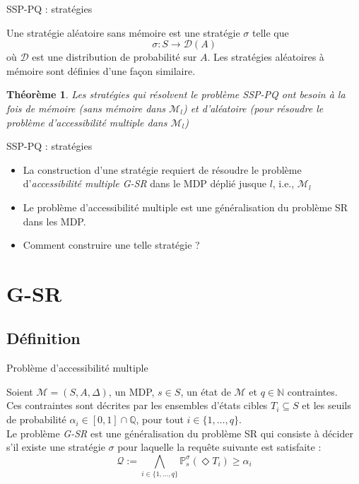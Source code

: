 \documentclass[compress]{beamer}
\theoremstyle{theorem}%
\newtheorem{theoreme}{Théorème}
\begin{document}
\begin{frame}{SSP-PQ : stratégies}
\footnotesize
\begin{definition}
Une stratégie aléatoire sans mémoire est une stratégie $\sigma$ telle que
\[
  \sigma : S \rightarrow \mathcal{D}(A)
\]
où $\mathcal{D}$ est une distribution de probabilité sur $A$.
Les stratégies aléatoires à mémoire sont définies d'une façon similaire.
\end{definition}

\begin{theoreme}
  Les stratégies qui résolvent le problème SSP-PQ ont besoin à la fois de mémoire (sans mémoire dans $\mathcal{M}_{l}$) et d'aléatoire (pour résoudre le problème d'accessibilité multiple  dans $\mathcal{M}_l$)
\end{theoreme}

\end{frame}

\begin{frame}{SSP-PQ : stratégies}
  \begin{itemize}
    \item La construction d'une stratégie requiert de résoudre le problème
    d'\textit{\color{fibeamer@orange}accessibilité multiple  G-SR} dans le MDP déplié jusque $l$, i.e., $\mathcal{M}_l$
    \item Le problème d'accessibilité multiple  est une généralisation du problème SR dans les MDP.
    \item Comment construire une telle stratégie ?
  \end{itemize}
\end{frame}

\section{G-SR}
\subsection{Définition}
\begin{frame}{Problème d'accessibilité multiple }
  \begin{definition}[G-SR]
  \small
    Soient {\color{fibeamer@orange}$\mathcal{M} = (S, A, \Delta)$}, un MDP, {\color{fibeamer@orange}$s \in S$}, un état de $\mathcal{M}$ et {\color{fibeamer@orange}$q \in \mathbb{N}$
    contraintes}. \\
    Ces contraintes sont décrites par les ensembles d'états cibles
    {\color{fibeamer@orange}$T_i \subseteq S$} et les seuils de probabilité {\color{fibeamer@orange}$\alpha_i \in
    [0, 1] \cap \mathbb{Q}$}, pour tout $i \in \{1, \dots, q\}$. \\
    Le problème \textit{\color{fibeamer@orange}G-SR} est une généralisation du problème SR qui consiste à décider s'il existe une stratégie {\color{fibeamer@orange}$\sigma$} pour laquelle la requête suivante est satisfaite : {\color{fibeamer@orange}
    \[
      \mathcal{Q} := \bigwedge_{i \in \{1, \dots, q\}} \mathbb{P}_s^\sigma(\Diamond T_i) \geq \alpha_i
    \]}
  \end{definition}
\end{frame}
\end{document}
